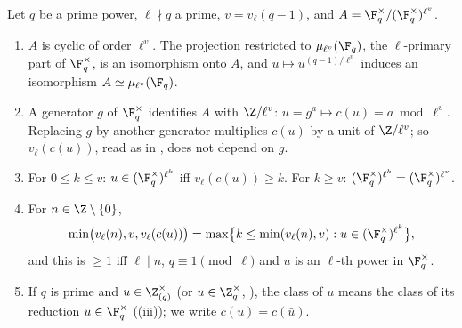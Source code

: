 \begin{proposition}\label{prop:rings:class-c}
Let $q$ be a prime power, $\ell\nmid q$ a prime, $v=v_\ell(q-1)$, and $A=\F_q^\times/(\F_q^\times)^{\ell^v}$.
\begin{enumerate}[label=(\roman*)]
\item $A$ is cyclic of order $\ell^v$. The projection restricted to $\mu_{\ell^v}(\F_q)$, the $\ell$-primary part of $\F_q^\times$, is an isomorphism onto $A$,
and $u\mapsto u^{(q-1)/\ell^v}$ induces an isomorphism $A\simeq\mu_{\ell^v}(\F_q)$.
\item A generator $g$ of $\F_q^\times$ identifies $A$ with $\Z/\ell^v$: $u=g^a\mapsto c(u)=a\bmod\ell^v$. Replacing $g$ by another generator multiplies
$c(u)$ by a unit of $\Z/\ell^v$; so $v_\ell(c(u))$, read as in , does not depend on $g$.
\item For $0\le k\le v$: $u\in(\F_q^\times)^{\ell^k}$ iff $v_\ell(c(u))\ge k$. For $k\ge v$: $(\F_q^\times)^{\ell^k}=(\F_q^\times)^{\ell^v}$.
\item For $n\in\Z\setminus\{0\}$,
\[
\min\bigl(v_\ell(n),v,v_\ell(c(u))\bigr)=\max\bigl\{k\le\min(v_\ell(n),v):u\in(\F_q^\times)^{\ell^k}\bigr\},
\]
and this is $\ge1$ iff $\ell\mid n$, $q\equiv1\pmod\ell$ and $u$ is an $\ell$-th power in $\F_q^\times$.
\item If $q$ is prime and $u\in\Z_{(q)}^\times$ (or $u\in\Z_q^\times$, ), the class of $u$ means the class of its reduction $\bar u\in\F_q^\times$
((iii)); we write $c(u)=c(\bar u)$.
\end{enumerate}
\end{proposition}

